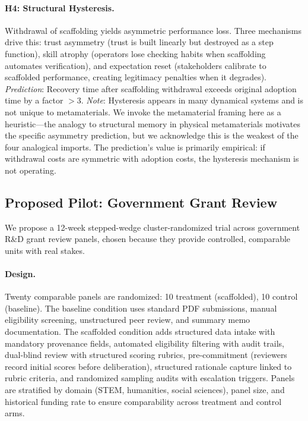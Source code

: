 \documentclass[runningheads]{llncs}
\begin{document}
\paragraph{H4: Structural Hysteresis.}
Withdrawal of scaffolding yields asymmetric performance loss. Three mechanisms drive this: trust asymmetry (trust is built linearly but destroyed as a step function), skill atrophy (operators lose checking habits when scaffolding automates verification), and expectation reset (stakeholders calibrate to scaffolded performance, creating legitimacy penalties when it degrades). \emph{Prediction}: Recovery time after scaffolding withdrawal exceeds original adoption time by a factor $>3$. \emph{Note}: Hysteresis appears in many dynamical systems and is not unique to metamaterials. We invoke the metamaterial framing here as a heuristic---the analogy to structural memory in physical metamaterials motivates the specific asymmetry prediction, but we acknowledge this is the weakest of the four analogical imports. The prediction's value is primarily empirical: if withdrawal costs are symmetric with adoption costs, the hysteresis mechanism is not operating.

\subsection{Proposed Pilot: Government Grant Review}

We propose a 12-week stepped-wedge cluster-randomized trial across government R\&D grant review panels, chosen because they provide controlled, comparable units with real stakes.

\paragraph{Design.}
Twenty comparable panels are randomized: 10 treatment (scaffolded), 10 control (baseline). The baseline condition uses standard PDF submissions, manual eligibility screening, unstructured peer review, and summary memo documentation. The scaffolded condition adds structured data intake with mandatory provenance fields, automated eligibility filtering with audit trails, dual-blind review with structured scoring rubrics, pre-commitment (reviewers record initial scores before deliberation), structured rationale capture linked to rubric criteria, and randomized sampling audits with escalation triggers. Panels are stratified by domain (STEM, humanities, social sciences), panel size, and historical funding rate to ensure comparability across treatment and control arms.
\end{document}
